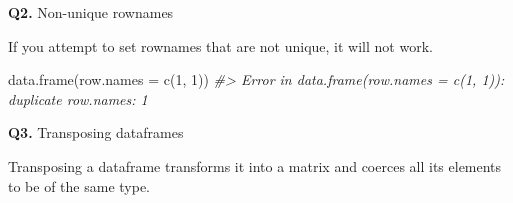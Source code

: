 \documentclass[
]{book}
\newenvironment{Shaded}{\begin{snugshade}}{\end{snugshade}}
\newcommand{\AttributeTok}[1]{\textcolor[rgb]{0.77,0.63,0.00}{#1}}
\newcommand{\CommentTok}[1]{\textcolor[rgb]{0.56,0.35,0.01}{\textit{#1}}}
\newcommand{\DecValTok}[1]{\textcolor[rgb]{0.00,0.00,0.81}{#1}}
\newcommand{\FunctionTok}[1]{\textcolor[rgb]{0.00,0.00,0.00}{#1}}
\newcommand{\NormalTok}[1]{#1}
\begin{document}
\textbf{Q2.} Non-unique rownames

If you attempt to set rownames that are not unique, it will not work.

\begin{Shaded}
\begin{Highlighting}[]
\FunctionTok{data.frame}\NormalTok{(}\AttributeTok{row.names =} \FunctionTok{c}\NormalTok{(}\DecValTok{1}\NormalTok{, }\DecValTok{1}\NormalTok{))}
\CommentTok{\#\textgreater{} Error in data.frame(row.names = c(1, 1)): duplicate row.names: 1}
\end{Highlighting}
\end{Shaded}

\textbf{Q3.} Transposing dataframes

Transposing a dataframe transforms it into a matrix and coerces all its elements to be of the same type.
\end{document}
